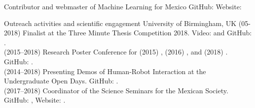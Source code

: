 \documentclass[10pt,a4paper,roman]{moderncv}
\begin{document}
{Contributor and webmaster of Machine Learning for Mexico}
{}
{GitHub: \href{https://github.com/ML4MX}{\faGithubAlt} }
{Website: \href{https://ml4mx.github.io/website/}{\faExternalLink}}
{}  %

{Outreach activities and scientific engagement}
{University of Birmingham, UK}
{}{}
{
(05-2018) Finalist at the Three Minute Thesis Competition 2018.
Video: \href{https://www.youtube.com/watch?v=07ewRYcS-0g}{\faYoutube} and 
GitHub: \href{https://github.com/mxochicale/3mt}{\faGithubAlt}. \\  
(2015--2018) Research Poster Conference for 
(2015) \href{https://github.com/mxochicale/PhD/blob/master/posters/Research_Poster_Conference_UoB/2015/poster/poster.pdf}{\faImage}, 
(2016) \href{https://github.com/mxochicale/PhD/blob/master/posters/Research_Poster_Conference_UoB/2016/poster/poster.pdf}{\faImage}, and  
(2018) \href{https://github.com/mxochicale/PhD/blob/master/posters/Research_Poster_Conference_UoB/2018/poster/main/map479-poster-uob2018.pdf}{\faImage}.
GitHub: \href{https://github.com/mxochicale/PhD/tree/master/posters/Research_Poster_Conference_UoB}{\faGithubAlt}. \\
(2014--2018) Presenting Demos of Human-Robot Interaction at the Undergraduate Open Days.
GitHub: \href{https://github.com/mxochicale/opendayuob-hridemo}{\faGithubAlt}. \\ 
(2017--2018) Coordinator of the Science Seminars for the Mexican Society. 
GitHub: \href{https://github.com/MexicanSocietyUoB}{\faGithubAlt}, 
Website: \href{https://mexicansocietyuob.github.io/seminars/}{\faExternalLink}. \\ 
}




%
\end{document}
